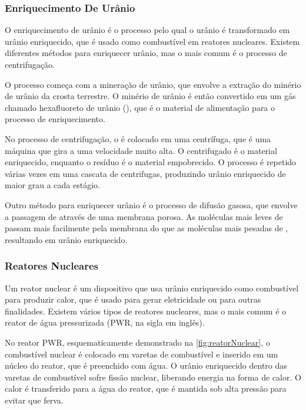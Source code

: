 \documentclass[11pt,a4paper]{article}
\begin{document}
            \subsubsection{Enriquecimento De Urânio}

                O enriquecimento de urânio é o processo pelo qual o urânio é transformado em urânio enriquecido, que é usado como combustível em reatores nucleares. Existem diferentes métodos para enriquecer urânio, mas o mais comum é o processo de centrifugação.

                O processo começa com a mineração de urânio, que envolve a extração do minério de urânio da crosta terrestre. O minério de urânio é então convertido em um gás chamado hexafluoreto de urânio (), que é o material de alimentação para o processo de enriquecimento.
                
                No processo de centrifugação, o  é colocado em uma centrífuga, que é uma máquina que gira a uma velocidade muito alta. O centrifugado é o material enriquecido, enquanto o resíduo é o material empobrecido. O processo é repetido várias vezes em uma cascata de centrifugas, produzindo urânio enriquecido de maior grau a cada estágio.
                
                Outro método para enriquecer urânio é o processo de difusão gasosa, que envolve a passagem de  através de uma membrana porosa. As moléculas mais leves de  passam mais facilmente pela membrana do que as moléculas mais pesadas de , resultando em urânio enriquecido.

            \subsubsection{Reatores Nucleares}

                Um reator nuclear é um dispositivo que usa urânio enriquecido como combustível para produzir calor, que é usado para gerar eletricidade ou para outras finalidades. Existem vários tipos de reatores nucleares, mas o mais comum é o reator de água pressurizada (PWR, na sigla em inglês).

                No reator PWR, esquematicamente demonstrado na \ref{fig:reatorNuclear}, o combustível nuclear é colocado em varetas de combustível e inserido em um núcleo do reator, que é preenchido com água. O urânio enriquecido dentro das varetas de combustível sofre fissão nuclear, liberando energia na forma de calor. O calor é transferido para a água do reator, que é mantida sob alta pressão para evitar que ferva.
                
\end{document}
